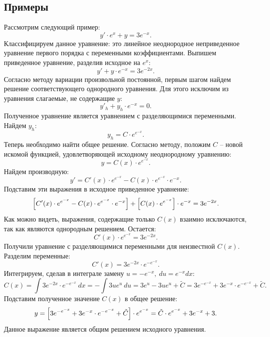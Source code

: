 	\subsection{Примеры}

		Рассмотрим следующий пример:
		\[ y' \cdot e^x + y = 3e^{-x}. \]
		Классифицируем данное уравнение: это линейное неоднородное неприведенное уравнение первого порядка с переменными коэффициентами. Выпишем приведенное уравнение, разделив исходное на $e^x$:
		\[ y' + y \cdot e^{-x} = 3e^{-2x}. \]
		Согласно методу вариации произвольной постоянной, первым шагом найдем решение соответствующего однородного уравнения. Для этого исключим из уравнения слагаемые, не содержащие $y$:
		\[ y'_h + y_h \cdot e^{-x} = 0. \]
		Полученное уравнение является уравнением с разделяющимися переменными. Найдем $y_h$:
		\[ y_h = C \cdot e^{e^{-x}}. \]
		Теперь необходимо найти общее решение. Согласно методу, положим $C$ -- новой искомой функцией, удовлетворяющей исходному неоднородному уравнению:
		\[ y = C(x) \cdot e^{e^{-x}}. \]
		Найдем производную:
		\[ y' = C'(x) \cdot e^{e^{-x}} - C(x) \cdot e^{e^{-x}} \cdot e^{-x}. \]
		Подставим эти выражения в исходное приведенное уравнение:
		\[ \left[ C'(x) \cdot e^{e^{-x}} - C(x) \cdot e^{e^{-x}} \cdot e^{-x} \right] + \left[ C(x) \cdot e^{e^{-x}} \right] \cdot e^{-x} = 3e^{-2x}. \]
		Как можно видеть, выражения, содержащие только $C(x)$ взаимно исключаются, так как являются однородным решением. Остается:
		\[ C'(x) \cdot e^{e^{-x}} = 3e^{-2x}. \]
		Получили уравнение с разделяющимися переменными для неизвестной $C(x)$. Разделим переменные:
		\[ C'(x) = 3e^{-2x} \cdot e^{-e^{-x}}. \]
		Интегрируем, сделав в интеграле замену $u = -e^{-x}, ~ du = e^{-x} dx$:
		\[ C(x) = \int 3e^{-2x} \cdot e^{-e^{-x}} ~ dx = -\int 3u e^u ~ du = 3e^u - 3u e^{u} + \tilde{C} = 3e^{-e^{-x}} + 3e^{-x} \cdot e^{-e^{-x}} + \tilde{C}. \]
		Подставим полученное значение $C(x)$ в общее решение:
		\[ y = \left[ 3e^{-e^{-x}} + 3e^{-x} \cdot e^{-e^{-x}} + \tilde{C} \right] \cdot e^{e^{-x}} = \tilde{C} \cdot e^{e^{-x}} + 3e^{-x} + 3. \]
		Данное выражение является общим решением исходного уравнения. 

	\pagebreak